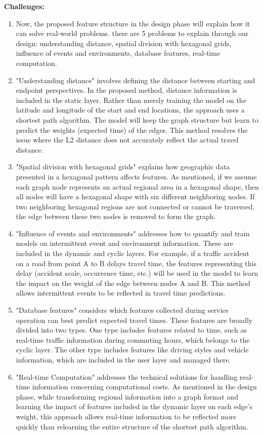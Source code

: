 \documentclass[12pt]{exam}
\begin{document}
\textbf{Challenges:} 
\begin{enumerate}
  \item Now, the proposed feature structure in the design phase will explain how it can solve real-world problems. there are 5 problems to explain through our design: understanding distance, spatial division with hexagonal grids, influence of events and environments, database features, real-time computation.

  \item "Understanding distance" involves defining the distance between starting and endpoint perspectives. In the proposed method, distance information is included in the static layer. Rather than merely training the model on the latitude and longitude of the start and end locations, the approach uses a shortest path algorithm. The model will keep the graph structure but learn to predict the weights (expected time) of the edges. This method resolves the issue where the L2 distance does not accurately reflect the actual travel distance.

  \item "Spatial division with hexagonal grids" explains how geographic data presented in a hexagonal pattern affects features. As mentioned, if we assume each graph node represents an actual regional area in a hexagonal shape, then all nodes will have a hexagonal shape with six different neighboring nodes. If two neighboring hexagonal regions are not connected or cannot be traversed, the edge between these two nodes is removed to form the graph.

  \item "Influence of events and environments" addresses how to quantify and train models on intermittent event and environment information. These are included in the dynamic and cyclic layers. For example, if a traffic accident on a road from point A to B delays travel time, the features representing this delay (accident scale, occurrence time, etc.) will be used in the model to learn the impact on the weight of the edge between nodes A and B. This method allows intermittent events to be reflected in travel time predictions.
  \item "Database features" considers which features collected during service operation can best predict expected travel times. These features are broadly divided into two types. One type includes features related to time, such as real-time traffic information during commuting hours, which belongs to the cyclic layer. The other type includes features like driving styles and vehicle information, which are included in the user layer and managed there.
  \item "Real-time Computation" addresses the technical solutions for handling real-time information concerning computational costs. As mentioned in the design phase, while transforming regional information into a graph format and learning the impact of features included in the dynamic layer on each edge's weight, this approach allows real-time information to be reflected more quickly than relearning the entire structure of the shortest path algorithm.
\end{enumerate}
\end{document}
